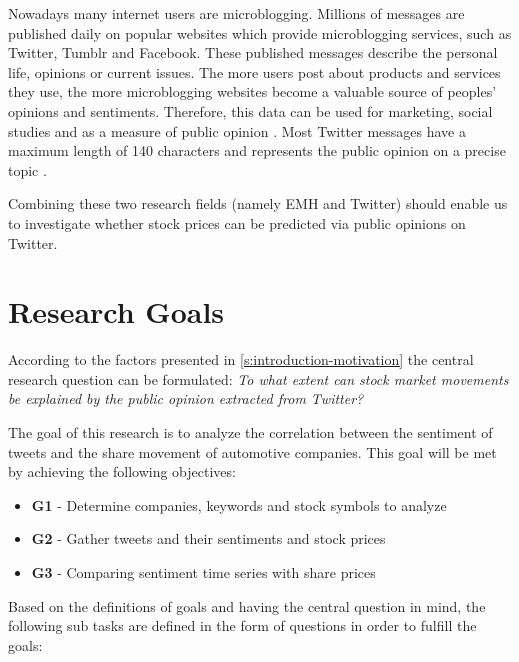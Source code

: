 Nowadays many internet users are microblogging.
Millions of messages are published daily on popular websites which provide microblogging services, such as Twitter, Tumblr and Facebook.
These published messages describe the personal life, opinions or current issues.
The more users post about products and services they use, the more microblogging websites become a valuable source of peoples' opinions and sentiments.
Therefore, this data can be used for marketing, social studies and as a measure of public opinion
\citep{Patodkar2016a, Pagolu2016a}. 
Most Twitter messages have a maximum length of 140 characters and represents the public opinion on a precise topic
\citep{Pagolu2016a}.

Combining these two research fields (namely \ac{EMH} and Twitter) should enable us to investigate whether stock prices can be predicted via public opinions on Twitter.

\section{Research Goals}
\label{s:introduction-researchgoals}

According to the factors presented in \cref{s:introduction-motivation} the central research question can be formulated:
\emph{To what extent can stock market movements be explained by the public opinion extracted from Twitter?}

The goal of this research is to analyze the correlation between the sentiment of tweets and the share movement of automotive companies.
This goal will be met by achieving the following objectives:

\begin{itemize}
    \item \textbf{G1} - Determine companies, keywords and stock symbols to analyze
    \item \textbf{G2} - Gather tweets and their sentiments and stock prices
    \item \textbf{G3} - Comparing sentiment time series with share prices
\end{itemize}

Based on the definitions of goals and having the central question in mind, the following sub tasks are defined in the form of questions in order to fulfill the goals:

